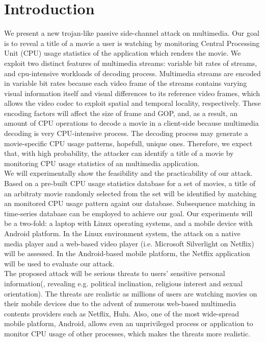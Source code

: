\section{Introduction}
\label{sec:introduction}
We present a new trojan-like passive side-channel attack on multimedia. Our goal is to reveal a title of a movie a user is watching by monitoring Central Processing Unit (CPU) usage statistics of the application which renders the movie. We exploit two distinct features of multimedia streams: variable bit rates of streams, and cpu-intensive workloads of decoding process. Multimedia streams are encoded in variable bit rates because each video frame of the streams contains varying visual information itself and visual differences to its reference video frames, which allows the video codec to exploit spatial and temporal locality, respectively. These encoding factors will affect the size of frame and GOP, and, as a result, an amount of CPU operations to decode a movie in a client-side because multimedia decoding is very CPU-intensive process. The decoding process may generate a movie-specific CPU usage patterns, hopefull, unique ones. Therefore, we expect that, with high probability, the attacker can identify a title of a movie by monitoring CPU usage statistics of an multimedia application.\\
\indent We will experimentally show the feasibility and the practicability of our attack. Based on a pre-built CPU usage statistics database for a set of movies, a title of an arbitraty movie randomly selected from the set will be identified by matching an monitored CPU usage pattern againt our database. Subsequence matching in time-series database can be employed to achieve our goal.  Our experiments will be a two-fold: a laptop with Linux operating systems, and a mobile device with Android platform. In the Linux environment system, the attack on a native media player and a web-based video player (i.e. Microsoft Silverlight on Netflix) will be assessed. In the Android-based mobile platform, the Netflix application will be used to evaluate our attack.\\
\indent The proposed attack will be serious threats to users' sensitive personal information(, revealing e.g. political inclination, religious interest and sexual orientation). The threats are realistic as millions of users are watching movies on their mobile devices due to the advent of numerous web-based multimedia contents providers such as Netflix, Hulu. Also, one of the most wide-spread mobile platform, Android, allows even an unprivileged process or application to monitor CPU usage of other processes, which makes the threats more realistic. 